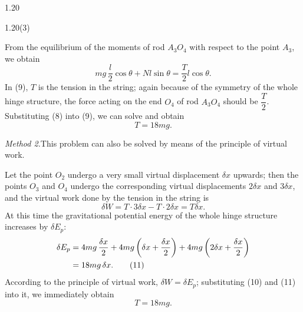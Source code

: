 \begin{solution}{1.20}
\begin{figbox}{1.20(3)}
\end{figbox}

From the equilibrium of the moments of rod $A_3O_4$ with respect to the point $A_3$, we obtain
\begin{equation}
mg\,\frac{l}{2}\cos\theta+Nl\sin\theta=\frac{T}{2}l\cos\theta. \tag{9}
\end{equation}
In (9), $T$ is the tension in the string; again because of the symmetry of the whole hinge structure, the force acting on the end $O_4$ of rod $A_3O_4$ should be $\dfrac{T}{2}$. Substituting (8) into (9), we can solve and obtain
\[
T=18mg.
\]

\textit{Method 2.}\quad This problem can also be solved by means of the principle of virtual work.

Let the point $O_2$ undergo a very small virtual displacement $\delta x$ upwards; then the points $O_3$ and $O_4$ undergo the corresponding virtual displacements $2\delta x$ and $3\delta x$, and the virtual work done by the tension in the string is
\begin{equation}
\delta W=T\cdot3\delta x-T\cdot2\delta x=T\delta x. \tag{10}
\end{equation}
At this time the gravitational potential energy of the whole hinge structure increases by $\delta E_p$:
\begin{align}
\delta E_p&=4mg\,\frac{\delta x}{2}+4mg\left(\delta x+\frac{\delta x}{2}\right)+4mg\left(2\delta x+\frac{\delta x}{2}\right)\notag\\
&=18mg\,\delta x. \tag{11}
\end{align}
According to the principle of virtual work, $\delta W=\delta E_p$; substituting (10) and (11) into it, we immediately obtain
\[
T=18mg.
\]


\end{solution}
